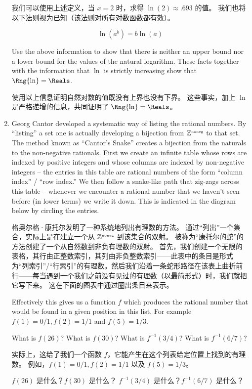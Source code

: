 \begin{enumerate}
  我们可以使用上述定义，当 $x=2$ 时，求得 $\ln (2) \approx .693$ 的值。
  我们也将以下法则视为已知（该法则对所有对数函数都有效）。
  
  \[ \ln(a^b) = b \ln(a) \]
  
  Use the above information to show that there is neither an upper bound 
  nor a lower bound for the values of the natural logarithm.
  These facts
  together with the information that $\ln$ is strictly increasing show that
  $\Rng{\ln} = \Reals$.
  
  使用以上信息证明自然对数的值既没有上界也没有下界。
  这些事实，加上 $\ln$ 是严格递增的信息，共同证明了 $\Rng{\ln} = \Reals$。
  
  \wbvfill
  
  \workbookpagebreak
  
  \item Georg Cantor developed a systematic way of listing the rational numbers.
  By ``listing'' a set one is actually developing a bijection from ${\mathbb Z}^{\mbox{\tiny noneg}}$ to
  that set.
  The method known as ``Cantor's Snake'' creates a bijection from
  the naturals to the non-negative rationals.
  First we create an infinite table whose rows
  are indexed by positive integers and whose columns are indexed by non-negative
  integers -- the entries in this table are rational numbers of the form
  ``column index'' / ``row index.''  We then follow a snake-like path that
  zig-zags across this table -- whenever we encounter a rational number that 
  we haven't seen before (in lower terms) we write it down.
  This is indicated 
  in the diagram below by circling the entries.
  
  \noindent 格奥尔格·康托尔发明了一种系统地列出有理数的方法。
  通过“列出”一个集合，实际上是在建立一个从 ${\mathbb Z}^{\mbox{\tiny noneg}}$ 到该集合的双射。
  被称为“康托尔的蛇”的方法创建了一个从自然数到非负有理数的双射。
  首先，我们创建一个无限的表格，其行由正整数索引，其列由非负整数索引——此表中的条目是形式为“列索引”/“行索引”的有理数。然后我们沿着一条蛇形路径在该表上曲折前行——每当遇到一个我们之前没有见过的有理数（以最简形式）时，我们就把它写下来。
  这在下面的图表中通过圈出条目来表示。
  
  \begin{center}
  
  \end{center}
  
  \workbookpagebreak
  
  Effectively this gives us a function $f$ which produces the rational number 
  that would be found in a given position in this list.
  For example 
  $f(1) = 0/1, f(2) = 1/1$ and $f(5) = 1/3$.  
  
  What is $f(26)$?  What is $f(30)$?
  What is $f^{-1}(3/4)$? What is $f^{-1}(6/7)$?
  
  实际上，这给了我们一个函数 $f$，它能产生在这个列表给定位置上找到的有理数。
  例如，$f(1) = 0/1, f(2) = 1/1$ 以及 $f(5) = 1/3$。
  
  $f(26)$ 是什么？$f(30)$ 是什么？
  $f^{-1}(3/4)$ 是什么？$f^{-1}(6/7)$ 是什么？
    
  \wbvfill
  
  \workbookpagebreak
   
  \end{enumerate}
  
  
